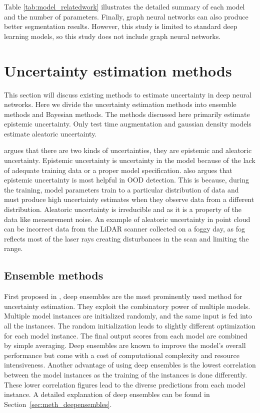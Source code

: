 Table \ref{tab:model_relatedwork} illustrates the detailed summary of each model and the number of parameters.
Finally, graph neural networks \cite{dyn_graph_cnn} can also produce better segmentation results. However, this study is limited to standard deep learning models, so this study does not include graph neural networks.

    \section{Uncertainty estimation methods}
    \label{sec:ue_methods}
    This section will discuss existing methods to estimate uncertainty in deep neural networks.
    Here we divide the uncertainty estimation methods into ensemble methods and Bayesian methods.
    The methods discussed here primarily estimate epistemic uncertainty. Only test time augmentation and gaussian density models estimate aleatoric uncertainty.

    \cite{matias_uncertainty} argues that there are two kinds of uncertainties, they are epistemic and aleatoric uncertainty.
    Epistemic uncertainty is uncertainty in the model because of the lack of adequate training data or a proper model specification.
    \cite{matias_uncertainty} also argues that epistemic uncertainty is most helpful in OOD detection.
    This is because, during the training, model parameters train to a particular distribution of data and
    must produce high uncertainty estimates when they observe data from a different distribution.
    Aleatoric uncertainty is irreducible and as it is a property of the data like measurement noise.
    An example of aleatoric uncertainty in point cloud can be incorrect data from the LiDAR scanner collected on a foggy day, as fog reflects most of the laser rays creating disturbances in the scan and limiting the range.
    \subsection{Ensemble methods}
    First proposed in \cite{lakshminarayanan2016simple}, deep ensembles are the most prominently used method for uncertainty estimation.
    They exploit the combinatory power of multiple models.
    Multiple model instances are initialized randomly, and the same input is fed into all the instances.
    The random initialization leads to slightly different optimization for each model instance. The final output scores from each model are combined by simple averaging.
    Deep ensembles are known to improve the model's overall performance but come with a cost of computational complexity and resource intensiveness.
    Another advantage of using deep ensembles is the lowest correlation between the model instances as the training of the instances is done differently.
    These lower correlation figures lead to the diverse predictions from each model instance.
    A detailed explanation of deep ensembles can be found in Section~\ref{sec:meth_deepensembles}.


